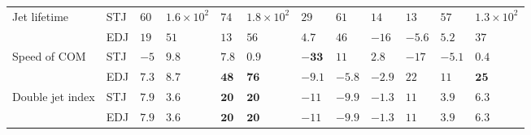 \begin{tabular}{l}
Jet lifetime & STJ & ${60}$ & ${1.6 \times 10^{2}}$ & ${74}$ & ${1.8 \times 10^{2}}$ & ${29}$ & ${61}$ & ${14}$ & ${13}$ & ${57}$ & ${1.3 \times 10^{2}}$ \\
 & EDJ & ${19}$ & ${51}$ & ${13}$ & ${56}$ & ${4.7}$ & ${46}$ & ${-16}$ & ${-5.6}$ & ${5.2}$ & ${37}$ \\
Speed of COM & STJ & ${-5}$ & ${9.8}$ & ${7.8}$ & ${0.9}$ & $\mathbf{-33}$ & ${11}$ & ${2.8}$ & ${-17}$ & ${-5.1}$ & ${0.4}$ \\
 & EDJ & ${7.3}$ & ${8.7}$ & $\mathbf{48}$ & $\mathbf{76}$ & ${-9.1}$ & ${-5.8}$ & ${-2.9}$ & ${22}$ & ${11}$ & $\mathbf{25}$ \\
Double jet index & STJ & ${7.9}$ & ${3.6}$ & $\mathbf{20}$ & $\mathbf{20}$ & ${-11}$ & ${-9.9}$ & ${-1.3}$ & ${11}$ & ${3.9}$ & ${6.3}$ \\
 & EDJ & ${7.9}$ & ${3.6}$ & $\mathbf{20}$ & $\mathbf{20}$ & ${-11}$ & ${-9.9}$ & ${-1.3}$ & ${11}$ & ${3.9}$ & ${6.3}$ \\
\bottomrule
\end{tabular}
